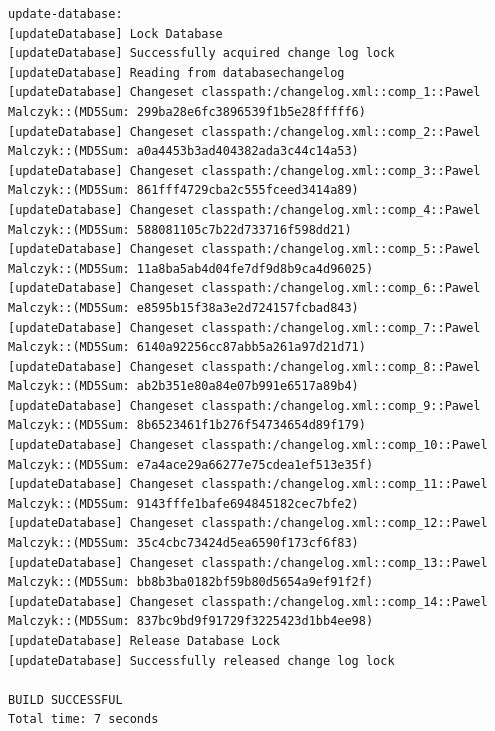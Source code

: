 \documentclass{article}
\begin{document}
{\begin{verbatim}
update-database:
[updateDatabase] Lock Database
[updateDatabase] Successfully acquired change log lock
[updateDatabase] Reading from databasechangelog
[updateDatabase] Changeset classpath:/changelog.xml::comp_1::Pawel Malczyk::(MD5Sum: 299ba28e6fc3896539f1b5e28fffff6)
[updateDatabase] Changeset classpath:/changelog.xml::comp_2::Pawel Malczyk::(MD5Sum: a0a4453b3ad404382ada3c44c14a53)
[updateDatabase] Changeset classpath:/changelog.xml::comp_3::Pawel Malczyk::(MD5Sum: 861fff4729cba2c555fceed3414a89)
[updateDatabase] Changeset classpath:/changelog.xml::comp_4::Pawel Malczyk::(MD5Sum: 588081105c7b22d733716f598dd21)
[updateDatabase] Changeset classpath:/changelog.xml::comp_5::Pawel Malczyk::(MD5Sum: 11a8ba5ab4d04fe7df9d8b9ca4d96025)
[updateDatabase] Changeset classpath:/changelog.xml::comp_6::Pawel Malczyk::(MD5Sum: e8595b15f38a3e2d724157fcbad843)
[updateDatabase] Changeset classpath:/changelog.xml::comp_7::Pawel Malczyk::(MD5Sum: 6140a92256cc87abb5a261a97d21d71)
[updateDatabase] Changeset classpath:/changelog.xml::comp_8::Pawel Malczyk::(MD5Sum: ab2b351e80a84e07b991e6517a89b4)
[updateDatabase] Changeset classpath:/changelog.xml::comp_9::Pawel Malczyk::(MD5Sum: 8b6523461f1b276f54734654d89f179)
[updateDatabase] Changeset classpath:/changelog.xml::comp_10::Pawel Malczyk::(MD5Sum: e7a4ace29a66277e75cdea1ef513e35f)
[updateDatabase] Changeset classpath:/changelog.xml::comp_11::Pawel Malczyk::(MD5Sum: 9143fffe1bafe694845182cec7bfe2)
[updateDatabase] Changeset classpath:/changelog.xml::comp_12::Pawel Malczyk::(MD5Sum: 35c4cbc73424d5ea6590f173cf6f83)
[updateDatabase] Changeset classpath:/changelog.xml::comp_13::Pawel Malczyk::(MD5Sum: bb8b3ba0182bf59b80d5654a9ef91f2f)
[updateDatabase] Changeset classpath:/changelog.xml::comp_14::Pawel Malczyk::(MD5Sum: 837bc9bd9f91729f3225423d1bb4ee98)
[updateDatabase] Release Database Lock
[updateDatabase] Successfully released change log lock

BUILD SUCCESSFUL
Total time: 7 seconds
\end{verbatim}
}
\end{document}
